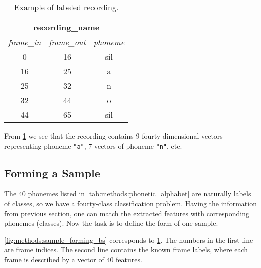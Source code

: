 \begin{table}[H]
\centering
\begin{tabular}{|c|c|c|}
\hline
\multicolumn{3}{|c|}{recording\_name}                                                                                     \\ \hline
\multicolumn{1}{|l|}{\textit{frame\_in}} & \multicolumn{1}{l|}{\textit{frame\_out}} & \multicolumn{1}{l|}{\textit{phoneme}} \\ \hline
0                                       & 16                                      & \_sil\_                               \\ \hline
16                                      & 25                                      & a                                     \\ \hline
25                                      & 32                                      & n                                     \\ \hline
32                                      & 44                                      & o                                     \\ \hline
44                                      & 65                                      & \_sil\_                               \\ \hline
\end{tabular}
\caption{Example of labeled recording.}
\label{tab:methods:labeling_example}
\end{table}

From \cref{tab:methods:labeling_example} we see that the recording contains $ 9 $ fourty-dimensional vectors representing phoneme \texttt{"a"}, $ 7 $ vectors of phoneme \texttt{"n"}, etc.

\subsection*{Forming a Sample}
The $ 40 $ phonemes listed in \cref{tab:methods:phonetic_alphabet} are naturally labels of classes, so we have a fourty-class classification problem. Having the information from previous section, one can match the extracted features with corresponding phonemes (classes). Now the task is to define the form of one sample.

\cref{fig:methods:sample_forming_bs} corresponds to \cref{tab:methods:labeling_example}. The numbers in the first line are frame indices. The second line contains the known frame labels, where each frame is described by a vector of $ 40 $ features.

